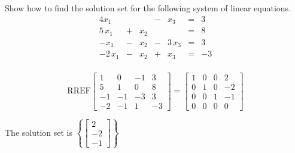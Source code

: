 
\begin{exerciseStatement}


Show how to find the solution set for the following system of linear equations. 
\begin{alignat*}{4} x_{1} & &  &-& x_{3} &=& 3 \\5 \, x_{1} &+& x_{2} & &  &=& 8 \\-x_{1} &-& x_{2} &-& 3 \, x_{3} &=& 3 \\-2 \, x_{1} &-& x_{2} &+& x_{3} &=& -3 \\ \end{alignat*}
            


\end{exerciseStatement}
    
\begin{exerciseAnswer} 
\[\mathrm{RREF} \left[\begin{array}{ccc|c}
1 & 0 & -1 & 3 \\
5 & 1 & 0 & 8 \\
-1 & -1 & -3 & 3 \\
-2 & -1 & 1 & -3
\end{array}\right]  =  \left[\begin{array}{ccc|c}
1 & 0 & 0 & 2 \\
0 & 1 & 0 & -2 \\
0 & 0 & 1 & -1 \\
0 & 0 & 0 & 0
\end{array}\right] \]

The solution set is \( \left\{ \left[\begin{array}{c}
2 \\
-2 \\
-1
\end{array}\right] \right\} \)


\end{exerciseAnswer}
    
